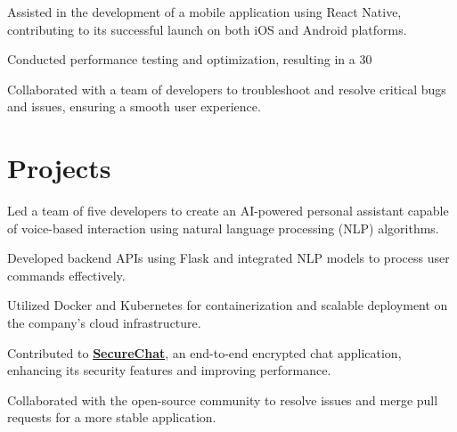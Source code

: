 \documentclass[]{deedy-resume-multilatex}
\begin{document}
\begin{minipage}[t]{0.60\textwidth}
\begin{tightemize}
\item Assisted in the development of a mobile application using React Native, contributing to its successful launch on both iOS and Android platforms.
\item Conducted performance testing and optimization, resulting in a 30%
\item Collaborated with a team of developers to troubleshoot and resolve critical bugs and issues, ensuring a smooth user experience.
\end{tightemize}
\sectionsep


\section{Projects}
\begin{tightemize}
\item Led a team of five developers to create an AI-powered personal assistant capable of voice-based interaction using natural language processing (NLP) algorithms.
\item Developed backend APIs using Flask and integrated NLP models to process user commands effectively.
\item Utilized Docker and Kubernetes for containerization and scalable deployment on the company's cloud infrastructure.
\end{tightemize}
\sectionsep

\begin{tightemize}
\item Contributed to \textbf{\href{https://github.com/SecureChat/SecureChat}{SecureChat}}, an end-to-end encrypted chat application, enhancing its security features and improving performance.
\item Collaborated with the open-source community to resolve issues and merge pull requests for a more stable application.
\end{tightemize}
\sectionsep

%
%

\end{minipage}
\end{document}
